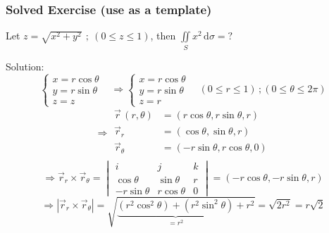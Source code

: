\documentclass[12pt, fleqn]{book}
\begin{document}
	 		\subsubsection{Solved Exercise (use as a template)}
	 			Let $z = \sqrt{x^2 + y^2} \ \, ; \ (0 \le z \le 1)$, then $\iint\limits_S x^2 \, \mathrm{d}\sigma = ?$
	 			
	 			Solution:
	 			\begin{equation*}
	 				\begin{cases}
	 					x = r\cos\theta & \\
	 					y = r\sin\theta & \\
	 					z = z
	 				\end{cases}
 				    \Rightarrow
 				    \begin{cases}
	 					x = r\cos\theta & \\
						y = r\sin\theta & \\
						z= r
 				    \end{cases}
 			    	\, (0 \le r \le 1) \, ; (0 \le \theta \le 2\pi) 			    	
	 			\end{equation*}
 				\begin{equation*}
 					\Rightarrow
 					\begin{split}
 						\vec{r}\,(r, \theta) 
 						               & = (r\cos\theta, r\sin\theta, r) \\
 						\vec{r}_r      & = (\cos\theta, \sin\theta, r) \\
 						\vec{r}_\theta & = (-r\sin\theta, r\cos\theta, 0) \\
 					\end{split}
 				\end{equation*}
 				\begin{equation*}
 					\Rightarrow
 					\vec{r}_r \times \vec{r}_\theta = 
 					\begin{vmatrix}
 						i            & j             & k \\
 						\cos\theta   & \sin\theta    & r \\
 						-r\sin\theta & r\cos\theta & 0
 					\end{vmatrix} = (-r\cos\theta, -r\sin\theta, r)
 				\end{equation*}
 				\begin{equation*}
 					\Rightarrow
					\left|\vec{r}_r \times \vec{r}_\theta\right|
         			 = \sqrt{
         			 	\underbrace{
             			 	(r^2\cos^2\theta) +
            			 	(r^2\sin^2\theta)
         		 	    }_{=r^2}
         	 	        + r^2
					 }
					 = \sqrt{2r^2}
					 = r\sqrt{2} 				
 				\end{equation*}
\end{document}
